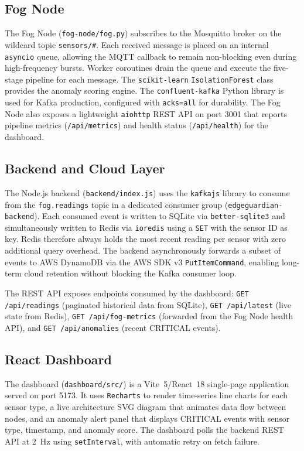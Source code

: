 \documentclass[conference]{IEEEtran}
\begin{document}
\subsection{Fog Node}

The Fog Node (\texttt{fog-node/fog.py}) subscribes to the Mosquitto broker
on the wildcard topic \texttt{sensors/\#}. Each received message is placed
on an internal \texttt{asyncio} queue, allowing the MQTT callback to remain
non-blocking even during high-frequency bursts. Worker coroutines drain the
queue and execute the five-stage pipeline for each message. The
\texttt{scikit-learn} \texttt{IsolationForest} class provides the anomaly
scoring engine. The \texttt{confluent-kafka} Python library is used for
Kafka production, configured with \texttt{acks=all} for durability. The Fog
Node also exposes a lightweight \texttt{aiohttp} REST API on port 3001 that
reports pipeline metrics (\texttt{/api/metrics}) and health status
(\texttt{/api/health}) for the dashboard.

\subsection{Backend and Cloud Layer}

The Node.js backend (\texttt{backend/index.js}) uses the \texttt{kafkajs}
library to consume from the \texttt{fog.readings} topic in a dedicated
consumer group (\texttt{edgeguardian-backend}). Each consumed event is
written to SQLite via \texttt{better-sqlite3} and simultaneously written to
Redis via \texttt{ioredis} using a \texttt{SET} with the sensor ID as key.
Redis therefore always holds the most recent reading per sensor with zero
additional query overhead. The backend asynchronously forwards a subset of
events to AWS DynamoDB via the AWS SDK v3 \texttt{PutItemCommand}, enabling
long-term cloud retention without blocking the Kafka consumer loop.

The REST API exposes endpoints consumed by the dashboard:
\texttt{GET /api/readings} (paginated historical data from SQLite),
\texttt{GET /api/latest} (live state from Redis),
\texttt{GET /api/fog-metrics} (forwarded from the Fog Node health API),
and \texttt{GET /api/anomalies} (recent CRITICAL events).

\subsection{React Dashboard}

The dashboard (\texttt{dashboard/src/}) is a Vite~5/React~18 single-page
application served on port 5173. It uses \texttt{Recharts} to render
time-series line charts for each sensor type, a live architecture SVG
diagram that animates data flow between nodes, and an anomaly alert panel
that displays CRITICAL events with sensor type, timestamp, and anomaly score.
The dashboard polls the backend REST API at 2~Hz using \texttt{setInterval},
with automatic retry on fetch failure.
\end{document}
